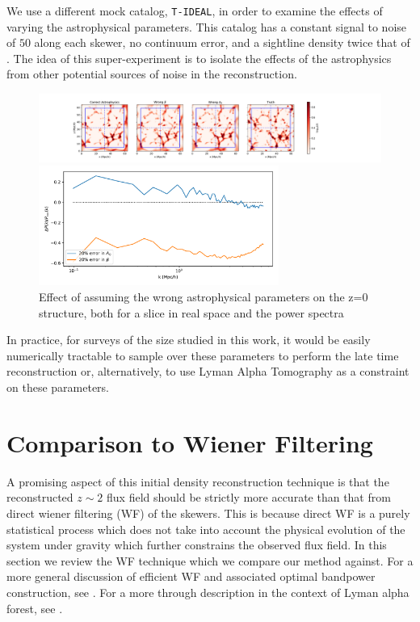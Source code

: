\documentclass[usenatbib,onecolumn]{mnras}
\begin{document}
We use a different mock catalog, \texttt{T-IDEAL}, in order to examine the effects of varying the astrophysical parameters. This catalog has a constant signal to noise of $50$ along each skewer, no continuum error, and a sightline density twice that of . The idea of this super-experiment is to isolate the effects of the astrophysics from other potential sources of noise in the reconstruction.

\begin{figure}
\centering 
  
  \includegraphics[trim=3cm 0cm 0cm 0cm,width=1.2\textwidth]{./appendix_figures/z=0_wrongdensity.pdf}
  
  
  \includegraphics[trim=0cm 0cm 0cm 0cm,width=0.70\textwidth]{./appendix_figures/wrong_astro_ps.pdf}
    \caption{Effect of assuming the wrong astrophysical parameters on the z=0 structure, both for a slice in real space and the power spectra} 
    \label{fig_sims2x2}
\end{figure}

In practice, for surveys of the size studied in this work, it would be easily numerically tractable to sample over these parameters to perform the late time reconstruction or, alternatively, to use Lyman Alpha Tomography as a constraint on these parameters.



\section{Comparison to Wiener Filtering}
\label{app:wf}

A promising aspect of this initial density reconstruction technique is that the reconstructed $z\sim 2$ flux field should be strictly more accurate than that from direct wiener filtering (WF) of the skewers. This is because direct WF is a purely statistical process which does not take into account the physical evolution of the system under gravity which further constrains the observed flux field. In this section we review the WF technique which we compare our method against. For a more general discussion of efficient WF and associated optimal bandpower construction, see \cite{seljak1998cosmography,2018Horowitz}. For a more through description in the context of Lyman alpha forest, see \cite{Stark2015}.
\end{document}
